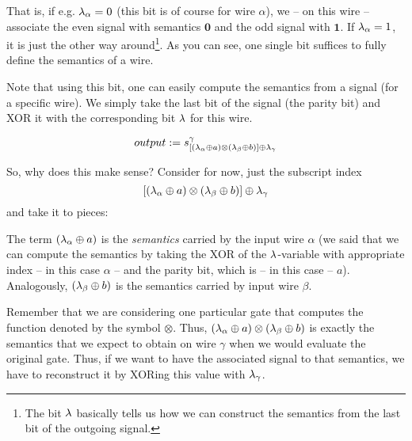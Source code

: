 \message{ !name(seminar.tex)}\documentclass{llncs}
\begin{document}
That is, if e.g. $\lambda_\alpha=0$ (this bit is of course for wire $\alpha$), we -- on this wire -- associate the even signal with semantics $\mathbf{0}$ and the odd signal with $\mathbf{1}$. If $\lambda_\alpha=1$, it is just the other way around\footnote{The bit $\lambda$ basically tells us how we can construct the semantics from the last bit of the outgoing signal.}. As you can see, one single bit suffices to fully define the semantics of a wire.

Note that using this bit, one can easily compute the semantics from a signal (for a specific wire). We simply take the last bit of the signal (the parity bit) and XOR it with the corresponding bit $\lambda$ for this wire.


\begin{equation}
  \label{eq:output-straight-definition-in-informal-part}
  output := s^\gamma_{ \left[ (\lambda_\alpha \oplus a) \otimes (\lambda_\beta \oplus b)\right]  \oplus \lambda_\gamma}
\end{equation}

So, why does this make sense? Consider for now, just the subscript index
\begin{equation*}
\left[ (\lambda_\alpha \oplus a) \otimes (\lambda_\beta \oplus b)\right]  \oplus \lambda_\gamma
\end{equation*}
and take it to pieces:

The term $(\lambda_\alpha \oplus a)$ is the \emph{semantics} carried by the input wire $\alpha$ (we said that we can compute the semantics by taking the XOR of the $\lambda$-variable with appropriate index -- in this case $\alpha$ -- and the parity bit, which is -- in this case -- $a$). Analogously, $(\lambda_\beta \oplus b)$ is the semantics carried by input wire $\beta$.

Remember that we are considering one particular gate that computes the function denoted by the symbol $\otimes$. Thus, $(\lambda_\alpha \oplus a)\otimes (\lambda_\beta \oplus b)$ is exactly the semantics that we expect to obtain on wire $\gamma$ when we would evaluate the original gate. Thus, if we want to have the associated signal to that semantics, we have to reconstruct it by XORing this value with $\lambda_\gamma$.
\end{document}
